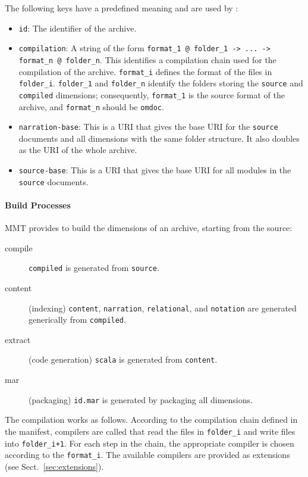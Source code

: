 The following keys have a predefined meaning and are used by {\mmt}:
\begin{itemize}
 \item \texttt{id}: The identifier of the archive.
 \item \texttt{compilation}: A string of the form \texttt{format\_1 @ folder\_1 -> ... -> format\_n @ folder\_n}. This identifies a compilation chain used for the compilation of the archive. \texttt{format\_i} defines the format of the files in \texttt{folder\_i}. \texttt{folder\_1} and \texttt{folder\_n} identify the folders storing the \texttt{source} and \texttt{compiled} dimensions; consequently, \texttt{format\_1} is the source format of the archive, and \texttt{format\_n} should be \texttt{omdoc}.
 \item \texttt{narration-base}: This is a URI that gives the base URI for the \texttt{source} documents and all dimensions with the same folder structure.
 It also doubles as the URI of the whole archive.
 \item \texttt{source-base}: This is a URI that gives the base URI for all modules in the \texttt{source} documents.
\end{itemize}


\paragraph{Build Processes}
MMT provides to build the dimensions of an archive, starting from the source:
\begin{description}
 \item[compile] \texttt{compiled} is generated from \texttt{source}.
 \item[content] (indexing) \texttt{content}, \texttt{narration}, \texttt{relational}, and \texttt{notation} are generated generically from \texttt{compiled}.
 \item[extract] (code generation) \texttt{scala} is generated from \texttt{content}.
 \item[mar] (packaging) \texttt{id.mar} is generated by packaging all dimensions.
\end{description}

The compilation works as follows. According to the compilation chain defined in the manifest, compilers are called that read the files in \texttt{folder\_i} and write files into \texttt{folder\_i+1}. For each step in the chain, the appropriate compiler is chosen according to the \texttt{format\_i}.
The available compilers are provided as extensions (see Sect.~\ref{sec:extensions}).

